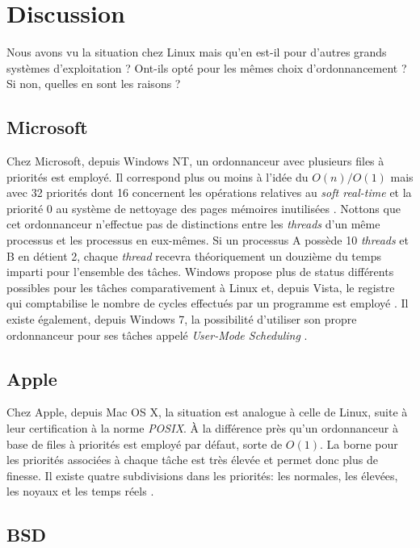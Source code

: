 \documentclass[letterpaper]{article}
\begin{document}
\section{Discussion}

Nous avons vu la situation chez Linux mais qu'en est-il pour d'autres grands systèmes d'exploitation ? Ont-ils opté pour les mêmes choix d'ordonnancement ? Si non, quelles en sont les raisons ?

\subsection{Microsoft}

Chez Microsoft, depuis Windows NT, un ordonnanceur avec plusieurs files à priorités est employé. Il correspond plus ou moins à l'idée du $O(n) / O(1)$ mais avec 32 priorités dont 16 concernent les opérations relatives au \textit{soft real-time} et la priorité 0 au système de nettoyage des pages mémoires inutilisées \citep{jones1999cpu}. Nottons que cet ordonnanceur n'effectue pas de distinctions entre les \textit{threads} d'un même processus et les processus en eux-mêmes. Si un processus A possède 10 \textit{threads} et B en détient 2, chaque \textit{thread} recevra théoriquement un douzième du temps imparti pour l'ensemble des tâches. Windows propose plus de status différents possibles pour les tâches comparativement à Linux et, depuis Vista, le registre qui comptabilise le nombre de cycles effectués par un programme est employé \citep{Russinovich:2009:WII:1717352}. Il existe également, depuis Windows 7, la possibilité d'utiliser son propre ordonnanceur pour ses tâches appelé \textit{User-Mode Scheduling} \citep{UMS}.

\subsection{Apple}

Chez Apple, depuis Mac OS X, la situation est analogue à celle de Linux, suite à leur certification à la norme \textit{POSIX}. À la différence près qu'un ordonnanceur à base de files à priorités est employé par défaut, sorte de $O(1)$. La borne pour les priorités associées à chaque tâche est très élevée et permet donc plus de finesse. Il existe quatre subdivisions dans les priorités: les normales, les élevées, les noyaux et les temps réels \citep{singh2006mac}.

\subsection{BSD}
\end{document}
